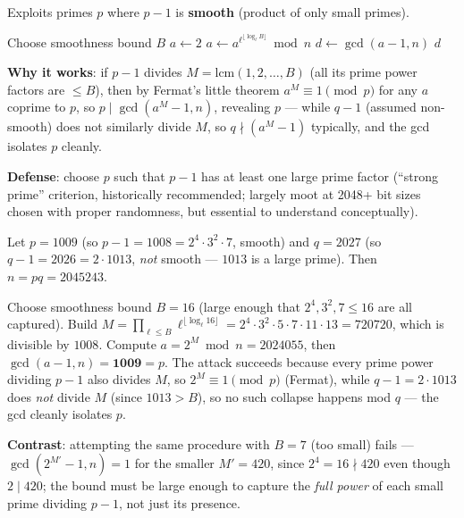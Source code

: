 Exploits primes $p$ where $p - 1$ is \textbf{smooth} (product of only small primes).

\begin{algorithm}[h]
\caption{Pollard's $p-1$}
\begin{algorithmic}[1]
\State Choose smoothness bound $B$
\State $a \gets 2$
    \State $a \gets a^{\ell^{\lfloor \log_\ell B \rfloor}} \bmod n$
\EndFor
\State $d \gets \gcd(a - 1, n)$
 \State \Return $d$ \EndIf
\end{algorithmic}
\end{algorithm}

\textbf{Why it works}: if $p - 1$ divides $M = \mathrm{lcm}(1,2,\dots,B)$ (all its prime power factors are $\le B$), then by Fermat's little theorem $a^{M} \equiv 1 \pmod p$ for any $a$ coprime to $p$, so $p \mid \gcd(a^M - 1, n)$, revealing $p$ — while $q - 1$ (assumed non-smooth) does not similarly divide $M$, so $q \nmid (a^M - 1)$ typically, and the gcd isolates $p$ cleanly.

\textbf{Defense}: choose $p$ such that $p-1$ has at least one large prime factor (``strong prime'' criterion, historically recommended; largely moot at 2048+ bit sizes chosen with proper randomness, but essential to understand conceptually).

\begin{example}
Let $p = 1009$ (so $p-1 = 1008 = 2^4 \cdot 3^2 \cdot 7$, smooth) and $q = 2027$ (so $q-1 = 2026 = 2 \cdot 1013$, \emph{not} smooth — $1013$ is a large prime). Then $n = pq = 2045243$.

Choose smoothness bound $B=16$ (large enough that $2^4, 3^2, 7 \le 16$ are all captured). Build $M = \prod_{\ell \le B} \ell^{\lfloor \log_\ell 16 \rfloor} = 2^4 \cdot 3^2 \cdot 5 \cdot 7 \cdot 11 \cdot 13 = 720720$, which is divisible by $1008$. Compute $a = 2^{M} \bmod n = 2024055$, then $\gcd(a - 1, n) = \mathbf{1009} = p$. The attack succeeds because every prime power dividing $p - 1$ also divides $M$, so $2^{M} \equiv 1 \pmod p$ (Fermat), while $q - 1 = 2 \cdot 1013$ does \emph{not} divide $M$ (since $1013 > B$), so no such collapse happens mod $q$ — the gcd cleanly isolates $p$.

\textbf{Contrast}: attempting the same procedure with $B=7$ (too small) fails — $\gcd(2^{M'}-1, n) = 1$ for the smaller $M' = 420$, since $2^4=16 \nmid 420$ even though $2 \mid 420$; the bound must be large enough to capture the \emph{full power} of each small prime dividing $p-1$, not just its presence.
\end{example}

